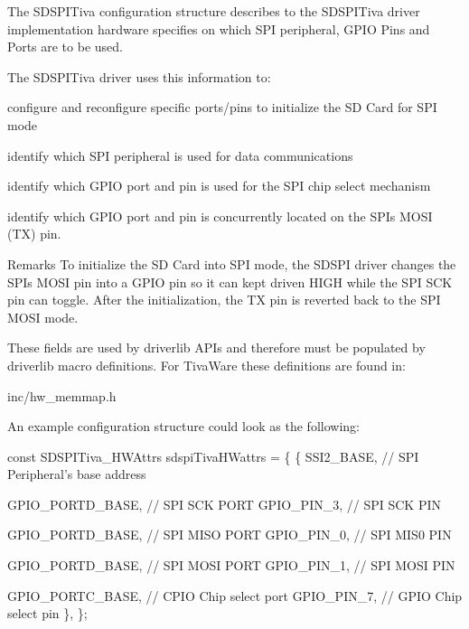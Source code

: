 The S\+D\+S\+P\+I\+Tiva configuration structure describes to the S\+D\+S\+P\+I\+Tiva driver implementation hardware specifies on which S\+P\+I peripheral, G\+P\+I\+O Pins and Ports are to be used.

The S\+D\+S\+P\+I\+Tiva driver uses this information to\+:
\begin{DoxyItemize}
\item configure and reconfigure specific ports/pins to initialize the S\+D Card for S\+P\+I mode
\item identify which S\+P\+I peripheral is used for data communications
\item identify which G\+P\+I\+O port and pin is used for the S\+P\+I chip select mechanism
\item identify which G\+P\+I\+O port and pin is concurrently located on the S\+P\+I\textquotesingle{}s M\+O\+S\+I (T\+X) pin.
\end{DoxyItemize}

\begin{DoxyRemark}{Remarks}
To initialize the S\+D Card into S\+P\+I mode, the S\+D\+S\+P\+I driver changes the S\+P\+I\textquotesingle{}s M\+O\+S\+I pin into a G\+P\+I\+O pin so it can kept driven H\+I\+G\+H while the S\+P\+I S\+C\+K pin can toggle. After the initialization, the T\+X pin is reverted back to the S\+P\+I M\+O\+S\+I mode.
\end{DoxyRemark}
These fields are used by driverlib A\+P\+Is and therefore must be populated by driverlib macro definitions. For Tiva\+Ware these definitions are found in\+:
\begin{DoxyItemize}
\item inc/hw\+\_\+memmap.\+h
\end{DoxyItemize}

An example configuration structure could look as the following\+: 
\begin{DoxyCode}
\textcolor{keyword}{const} SDSPITiva_HWAttrs sdspiTivaHWattrs = \{
    \{
         SSI2\_BASE, \textcolor{comment}{// SPI Peripheral's base address}

         GPIO\_PORTD\_BASE, \textcolor{comment}{// SPI SCK PORT}
         GPIO\_PIN\_3,      \textcolor{comment}{// SPI SCK PIN}

         GPIO\_PORTD\_BASE, \textcolor{comment}{// SPI MISO PORT}
         GPIO\_PIN\_0,      \textcolor{comment}{// SPI MIS0 PIN}

         GPIO\_PORTD\_BASE, \textcolor{comment}{// SPI MOSI PORT}
         GPIO\_PIN\_1,      \textcolor{comment}{// SPI MOSI PIN}

         GPIO\_PORTC\_BASE, \textcolor{comment}{// CPIO Chip select port}
         GPIO\_PIN\_7,      \textcolor{comment}{// GPIO Chip select pin}
     \},
\};
\end{DoxyCode}
 

